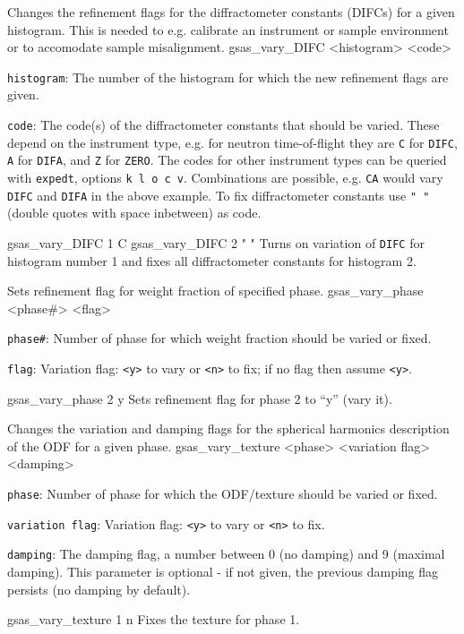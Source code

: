 {
Changes the refinement flags for the diffractometer constants (DIFCs) for a given histogram. This is needed to e.g. calibrate an instrument or sample environment or to accomodate sample misalignment.
}{
gsas\_vary\_DIFC <histogram> <code>
}{
\item \texttt{histogram}: The number of the histogram for which the new refinement flags are given.
\item \texttt{code}: The code(s) of the diffractometer constants that should be varied. These depend on the instrument type, e.g. for neutron time-of-flight they are \texttt{C} for \texttt{DIFC}, \texttt{A} for \texttt{DIFA}, and \texttt{Z} for \texttt{ZERO}. The codes for other instrument types can be queried with \texttt{expedt}, options \texttt{k l o c v}. Combinations are possible, e.g. \texttt{CA} would vary \texttt{DIFC} and \texttt{DIFA} in the above example. To fix diffractometer constants use \texttt{" "} (double quotes with space inbetween) as code.
}{
gsas\_vary\_DIFC 1 C
\newline
gsas\_vary\_DIFC 2 " "
}{
Turns on variation of \texttt{DIFC} for histogram number 1 and fixes all diffractometer constants for histogram 2.
}

{
Sets refinement flag for weight fraction of specified phase.  
}{
gsas\_vary\_phase <phase\#> <flag>
}{
\item \texttt{phase\#}:  Number of phase for which weight fraction should be varied or fixed. 
\item \texttt{flag}: Variation flag: \texttt{<y>} to vary or \texttt{<n>} to fix; if no flag then assume \texttt{<y>}.  
}{
gsas\_vary\_phase 2 y
}{
Sets refinement flag for phase 2 to ``y'' (vary it).
}

{
Changes the variation and damping flags for the spherical harmonics description of the ODF for a given phase.
}{
gsas\_vary\_texture <phase> <variation flag> <damping>
}{
\item \texttt{phase}:  Number of phase for which the ODF/texture should be varied or fixed. 
\item \texttt{variation flag}: Variation flag: \texttt{<y>} to vary or \texttt{<n>} to fix.  
\item \texttt{damping}: The damping flag, a number between 0 (no damping) and 9 (maximal damping). This parameter is optional - if not given, the previous damping flag persists (no damping by default).
}{
gsas\_vary\_texture 1 n
}{
Fixes the texture for phase 1.
}

